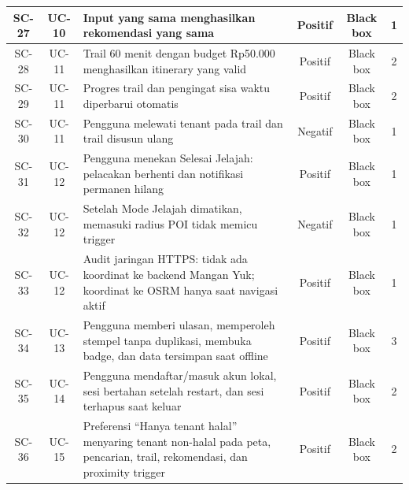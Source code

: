 \begin{longtable}{|C{0.09}|C{0.09}|L{0.48}|C{0.11}|C{0.13}|C{0.10}|}
SC-27 & UC-10 & Input yang sama menghasilkan rekomendasi yang sama & Positif & Black box & 1 \\ \hline
SC-28 & UC-11 & Trail 60 menit dengan budget Rp50.000 menghasilkan itinerary yang valid & Positif & Black box & 2 \\ \hline
SC-29 & UC-11 & Progres trail dan pengingat sisa waktu diperbarui otomatis & Positif & Black box & 2 \\ \hline
SC-30 & UC-11 & Pengguna melewati tenant pada trail dan trail disusun ulang & Negatif & Black box & 1 \\ \hline
SC-31 & UC-12 & Pengguna menekan Selesai Jelajah: pelacakan berhenti dan notifikasi permanen hilang & Positif & Black box & 1 \\ \hline
SC-32 & UC-12 & Setelah Mode Jelajah dimatikan, memasuki radius POI tidak memicu trigger & Negatif & Black box & 1 \\ \hline
SC-33 & UC-12 & Audit jaringan HTTPS: tidak ada koordinat ke backend Mangan Yuk; koordinat ke OSRM hanya saat navigasi aktif & Positif & Black box & 1 \\ \hline
SC-34 & UC-13 & Pengguna memberi ulasan, memperoleh stempel tanpa duplikasi, membuka badge, dan data tersimpan saat offline & Positif & Black box & 3 \\ \hline
SC-35 & UC-14 & Pengguna mendaftar/masuk akun lokal, sesi bertahan setelah restart, dan sesi terhapus saat keluar & Positif & Black box & 2 \\ \hline
SC-36 & UC-15 & Preferensi ``Hanya tenant halal'' menyaring tenant non-halal pada peta, pencarian, trail, rekomendasi, dan proximity trigger & Positif & Black box & 2 \\ \hline
\end{longtable}
